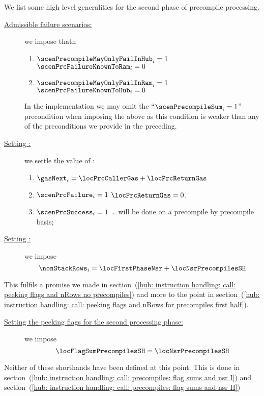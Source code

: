 \begin{center}
\end{center}
We list some high level generalities for the second phase of precompile processing. 
\begin{description}
	\item[\underline{Admissible failure scenarios:}]
		we impose thath
		\begin{enumerate}
			\item \If $\scenPrecompileMayOnlyFailInHub _{i} = 1$ \Then $\scenPrcFailureKnownToRam _{i} = 0$
			\item \If $\scenPrecompileMayOnlyFailInRam _{i} = 1$ \Then $\scenPrcFailureKnownToHub _{i} = 0$
		\end{enumerate}
		\saNote{}
		In the implementation we may omit the ``$\scenPrecompileSum _{i} = 1$'' precondition when imposing the above
		as this condition is weaker than any of the preconditions we provide in the preceding.
	\item[\underline{Setting \gasNext{}:}] we settle the value of \gasNext{}:
		\begin{enumerate}
			\item $\gasNext_{i} = \locPrcCallerGas + \locPrcReturnGas$
			\item \If $\scenPrcFailure_{i} = 1$ \Then $\locPrcReturnGas = 0$.
			\item \If $\scenPrcSuccess_{i} = 1$ \Then \dots{} will be done on a precompile by precompile basis;
		\end{enumerate}
	\item[\underline{Setting \nonStackRows{}:}]
		we impose
		\[ \nonStackRows_{i} = \locFirstPhaseNsr + \locNsrPrecompilesSH \]
\end{description}
\saNote{} This fulfils a promise we made in
section~(\ref{hub: instruction handling: call: peeking flags and nRows no precompiles}) and more to the point in
section~(\ref{hub: instruction handling: call: peeking flags and nRows for precompiles first half}).
\begin{description}
	\item[\underline{Setting the peeking flags for the second processing phase:}]
		we impose
		\[ \locFlagSumPrecompilesSH = \locNsrPrecompilesSH \]
\end{description} 
\saNote{} 
Neither of these shorthands have been defined at this point.
This is done in
section~(\ref{hub: instruction handling: call: precompiles: flag sums and nsr I}) and
section~(\ref{hub: instruction handling: call: precompiles: flag sums and nsr II})
